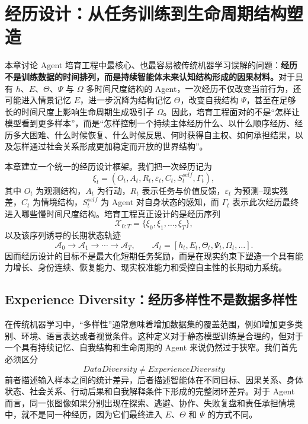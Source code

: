\chapter{经历设计：从任务训练到生命周期结构塑造}

\begin{chapterlead}
本章讨论 Agent 培育工程中最核心、也最容易被传统机器学习误解的问题：\textbf{经历不是训练数据的时间排列，而是持续智能体未来认知结构形成的因果材料。}对于具有 $h$、$E$、$\Theta$、$\Psi$ 与 $\Omega$ 多时间尺度结构的 Agent，一次经历不仅改变当前行为，还可能进入情景记忆 $E$，进一步沉降为结构记忆 $\Theta$，改变自我结构 $\Psi$，甚至在足够长的时间尺度上影响生命周期生成吸引子 $\Omega$。因此，培育工程面对的不是“怎样让模型看到更多样本”，而是“怎样控制一个持续主体经历什么、以什么顺序经历、经历多大困难、什么时候恢复、什么时候反思、何时获得自主权、如何承担结果，以及怎样通过社会关系形成更加稳定而开放的世界结构”。

本章建立一个统一的经历设计框架。我们把一次经历记为
\[
\xi_t=
\left(
O_t,
A_t,
R_t,
\varepsilon_t,
C_t,
S_t^{self},
\Gamma_t
\right),
\]
其中 $O_t$ 为观测结构，$A_t$ 为行动，$R_t$ 表示任务与价值反馈，$\varepsilon_t$ 为预测--现实残差，$C_t$ 为情境结构，$S_t^{self}$ 为 Agent 对自身状态的感知，而 $\Gamma_t$ 表示此次经历最终进入哪些慢时间尺度结构。培育工程真正设计的是经历序列
\[
\mathcal X_{0:T}
=
\{\xi_0,\xi_1,\ldots,\xi_T\},
\]
以及该序列诱导的长期状态轨迹
\[
\mathcal A_0
\rightarrow
\mathcal A_1
\rightarrow
\cdots
\rightarrow
\mathcal A_T,
\qquad
\mathcal A_t=
[h_t,E_t,\Theta_t,\Psi_t,\Omega_t,\ldots].
\]
因而经历设计的目标不是最大化短期任务奖励，而是在现实约束下塑造一个具有能力增长、身份连续、恢复能力、现实校准能力和受控自主性的长期动力系统。
\end{chapterlead}


\section{Experience Diversity：经历多样性不是数据多样性}

在传统机器学习中，“多样性”通常意味着增加数据集的覆盖范围，例如增加更多类别、环境、语言表达或者视觉条件。这种定义对于静态模型训练是合理的，但对于一个具有持续记忆、自我结构和生命周期的 Agent 来说仍然过于狭窄。我们首先必须区分
\[
\boxed{
DataDiversity
\neq
ExperienceDiversity
}
\]
前者描述输入样本之间的统计差异，后者描述智能体在不同目标、因果关系、身体状态、社会关系、行动后果和自我解释条件下形成的完整闭环差异。对于 Agent 而言，同一张图像如果分别出现在探索、逃避、协作、失败复盘和责任承担情境中，就不是同一种经历，因为它们最终进入 $E$、$\Theta$ 和 $\Psi$ 的方式不同。

